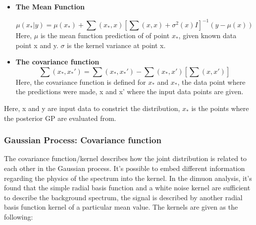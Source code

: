     \begin{itemize}

        \item \textbf{The Mean Function}

    \begin{equation}
        \mu(x_{*}|y)  = \mu(x_{*})+ \sum(x_{*}, x)[\sum(x, x)+ \sigma^{2}(x)I]^{-1}(y-\mu(x))
    \end{equation}
    Here, $\mu$ is the mean function prediction of of point $x_{*}$, given known data point x and y. $\sigma$ is the kernel variance at point x.

    \item \textbf{The covariance function}
    \begin{equation}
        \sum(x_{*}, x_{*}') = \sum(x_{*}, x_{*}') - \sum(x_{*}, x')[\sum(x, x')]
    \end{equation}
    Here,  the covariance function is defined for $x_{*}$ and $x_{*}$, the data point where the predictions were made, x and x' where the input data points are given.

    \end{itemize}

    Here, x and y are input data to constrict the distribution, $x_{*}$ is the points where the posterior GP are evaluated from. 

\subsubsection{Gaussian Process: Covariance function}
\label{sec:kernel}
The covariance function/kernel describes how the joint distribution is related to each other in the Gaussian process. 
It's possible to embed different information regarding the physics of the spectrum into the kernel. 
In the dimuon analysis, it's found that the simple radial basis function and a white noise kernel are sufficient to describe the background spectrum, the signal is described by another radial basis function kernel of a particular mean value.
The kernels are given as the following:

